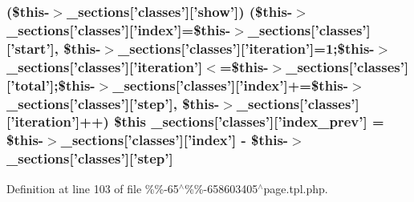 {{{{{{{{{{\subsubsection[{\-\_\-sections}]{ (\$this-\/$>${\bf \-\_\-sections}\mbox{[}'classes'\mbox{]}\mbox{[}'show'\mbox{]}) (\$this-\/$>${\bf \-\_\-sections}\mbox{[}'classes'\mbox{]}\mbox{[}'index'\mbox{]}=\$this-\/$>${\bf \-\_\-sections}\mbox{[}'classes'\mbox{]}\mbox{[}'start'\mbox{]}, \$this-\/$>${\bf \-\_\-sections}\mbox{[}'classes'\mbox{]}\mbox{[}'iteration'\mbox{]}=1;\$this-\/$>${\bf \-\_\-sections}\mbox{[}'classes'\mbox{]}\mbox{[}'iteration'\mbox{]}$<$=\$this-\/$>${\bf \-\_\-sections}\mbox{[}'classes'\mbox{]}\mbox{[}'total'\mbox{]};\$this-\/$>${\bf \-\_\-sections}\mbox{[}'classes'\mbox{]}\mbox{[}'index'\mbox{]}+=\$this-\/$>${\bf \-\_\-sections}\mbox{[}'classes'\mbox{]}\mbox{[}'step'\mbox{]}, \$this-\/$>${\bf \-\_\-sections}\mbox{[}'classes'\mbox{]}\mbox{[}'iteration'\mbox{]}++) \$this {\bf \-\_\-sections}\mbox{[}'classes'\mbox{]}\mbox{[}'index\-\_\-prev'\mbox{]} = \$this-\/$>${\bf \-\_\-sections}\mbox{[}'classes'\mbox{]}\mbox{[}'index'\mbox{]} -\/ \$this-\/$>${\bf \-\_\-sections}\mbox{[}'classes'\mbox{]}\mbox{[}'step'\mbox{]}}}\label{default_234d6fa4bfd5eef6424a9ddc74a166350_2_06_06-65_05_06_06-658603405_05page_8tpl_8php_aa2fe4d477b937b9791c3a714dd183f23}


\-Definition at line 103 of file \%\%-\/65$^\wedge$\%\%-\/658603405$^\wedge$page.\-tpl.\-php.

\hypertarget{default_234d6fa4bfd5eef6424a9ddc74a166350_2_06_06-65_05_06_06-658603405_05page_8tpl_8php_abad017eba10a7614c9fc740f14d8e26a}{
\index{\-\_\-sections@{\-\_\-sections}!default/34d6fa4bfd5eef6424a9ddc74a166350/%
\subsubsection[{\-\_\-sections}]{\setlength{\rightskip}{0pt plus 5cm}\$this {\bf \-\_\-sections}\mbox{[}'classes'\mbox{]}\mbox{[}'index\-\_\-next'\mbox{]} = \$this-\/$>${\bf \-\_\-sections}\mbox{[}'classes'\mbox{]}\mbox{[}'index'\mbox{]} + \$this-\/$>${\bf \-\_\-sections}\mbox{[}'classes'\mbox{]}\mbox{[}'step'\mbox{]}}}\label{default_234d6fa4bfd5eef6424a9ddc74a166350_2_06_06-65_05_06_06-658603405_05page_8tpl_8php_abad017eba10a7614c9fc740f14d8e26a}


}}}}}}}}}}
